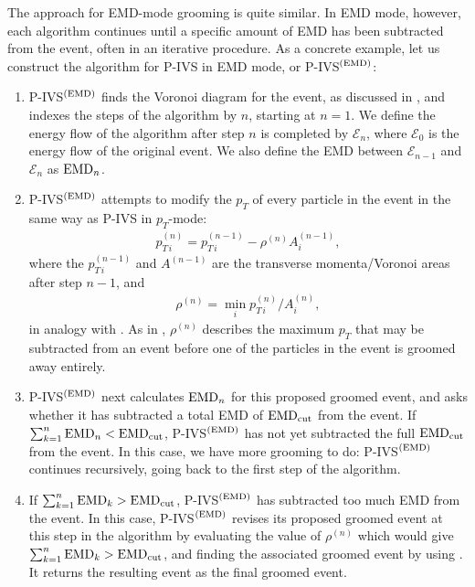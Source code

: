 The approach for EMD-mode grooming is quite similar.
%
In EMD mode, however, each algorithm continues until a specific amount of EMD has been subtracted from the event, often in an iterative procedure.
%
As a concrete example, let us construct the algorithm for P-IVS in EMD mode, or P-IVS\(^{(\rm EMD)}\):
%
\begin{enumerate}
    \item
    P-IVS\(^{(\rm EMD)}\) finds the Voronoi diagram for the event, as discussed in , and indexes the steps of the algorithm by \(n\), starting at \(n=1\).
    We define the energy flow of the algorithm after step \(n\) is completed by \(\mathcal{E}_n\), where \(\mathcal{E}_0\) is the energy flow of the original event.
    We also define the EMD between \(\mathcal{E}_{n-1}\) and \(\mathcal{E}_n\) as \({\rm EMD}_n\).

    \item
    P-IVS\(^{(\rm EMD)}\) attempts to modify the \(p_T\) of every particle in the event in the same way as P-IVS in \(p_T\)-mode:
    \begin{align}
	p_{T\,i}^{(n)} = p_{T\,i}^{(n-1)} - \rho^{(n)} A^{(n-1)}_i,
	\label{eqn:ivs_emd}
    \end{align}
    where the \(p_{T\,i}^{(n-1)}\) and \(A^{(n-1)}\) are the transverse momenta/Voronoi areas after step \(n-1\), and
    \begin{align}
        \rho^{(n)}
        =
        \min_i p^{(n)}_{T\,i}/A^{(n)}_i
        ,
    \end{align}
    in analogy with .
    As in , \(\rho^{(n)}\) describes the maximum \(p_T\) that may be subtracted from an event before one of the particles in the event is groomed away entirely.

    \item
    P-IVS\(^{(\rm EMD)}\) next calculates \({\rm EMD}_n\) for this proposed groomed event, and asks whether it has subtracted a total EMD of \( {\rm EMD}_{\rm cut}\) from the event.
    If \(\sum_{k = 1}^n {\rm EMD}_n < {\rm EMD}_{\rm cut}\), P-IVS\(^{(\rm EMD)}\) has not yet subtracted the full \({\rm EMD}_{\rm cut}\) from the event.
    In this case, we have more grooming to do:
    P-IVS\(^{(\rm EMD)}\) continues recursively, going back to the first step of the algorithm.

    \item
    If \(\sum_{k = 1}^n {\rm EMD}_k > {\rm EMD}_{\rm cut}\), P-IVS\(^{(\rm EMD)}\) has subtracted too much EMD from the event.
    In this case, P-IVS\(^{(\rm EMD)}\) revises its proposed groomed event at this step in the algorithm by evaluating the value of \(\rho^{(n)}\) which would give \(\sum_{k = 1}^n {\rm EMD}_k > {\rm EMD}_{\rm cut}\), and finding the associated groomed event by using .
    It returns the resulting event as the final groomed event.
\end{enumerate}
